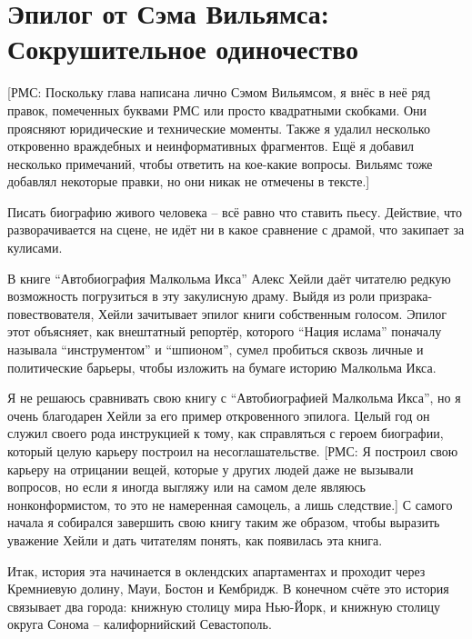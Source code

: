 

\chapter{Эпилог от Сэма Вильямса: Сокрушительное одиночество}

[РМС: Поскольку глава написана лично Сэмом Вильямсом, я внёс в неё ряд правок, помеченных буквами РМС или просто квадратными скобками. Они проясняют юридические и технические моменты. Также я удалил несколько откровенно враждебных и неинформативных фрагментов. Ещё я добавил несколько примечаний, чтобы ответить на кое-какие вопросы. Вильямс тоже добавлял некоторые правки, но они никак не отмечены в тексте.]

Писать биографию живого человека -- всё равно что ставить пьесу. Действие, что разворачивается на сцене, не идёт ни в какое сравнение с драмой, что закипает за кулисами.

В книге ``Автобиография Малкольма Икса'' Алекс Хейли даёт читателю редкую возможность погрузиться в эту закулисную драму. Выйдя из роли призрака-повествователя, Хейли зачитывает эпилог книги собственным голосом. Эпилог этот объясняет, как внештатный репортёр, которого ``Нация ислама'' поначалу называла ``инструментом'' и ``шпионом'', сумел пробиться сквозь личные и политические барьеры, чтобы изложить на бумаге историю Малкольма Икса.

Я не решаюсь сравнивать свою книгу с ``Автобиографией Малкольма Икса'', но я очень благодарен Хейли за его пример откровенного эпилога. Целый год он служил своего рода инструкцией к тому, как справляться с героем биографии, который целую карьеру построил на несоглашательстве. [РМС: Я построил свою карьеру на отрицании вещей, которые у других людей даже не вызывали вопросов, но если я иногда выгляжу или на самом деле являюсь нонконформистом, то это не намеренная самоцель, а лишь следствие.] С самого начала я собирался завершить свою книгу таким же образом, чтобы выразить уважение Хейли и дать читателям понять, как появилась эта книга.

Итак, история эта начинается в оклендских апартаментах и проходит через Кремниевую долину, Мауи, Бостон и Кембридж. В конечном счёте это история связывает два города: книжную столицу мира Нью-Йорк, и книжную столицу округа Сонома -- калифорнийский Севастополь.

